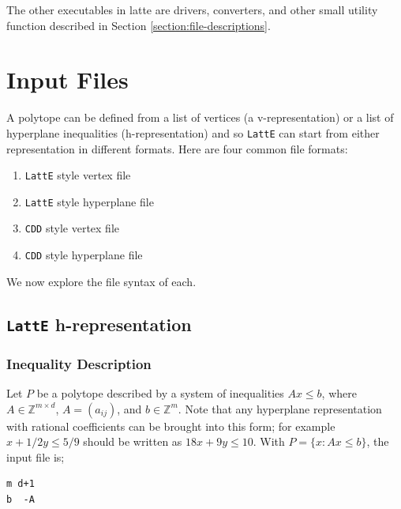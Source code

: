 \documentclass{article}
\newcommand{\Z}{{\mathbb Z}}
\newcommand{\latte}{{\tt LattE}\xspace}
\newcommand{\cdd}{{\tt CDD}\xspace}
\begin{document}
The other executables in latte are drivers, converters, and other small utility function described in Section \ref{section:file-descriptions}.


\section{Input Files}\label{Input Files}

A polytope can be defined from a list of vertices (a v-representation) or a list of hyperplane inequalities (h-representation) and so \latte can start from either representation in different formats. Here are four common file formats:
\begin{enumerate}
	\item \latte style vertex file
	\item \latte style hyperplane file
	\item \cdd style vertex file
	\item \cdd style hyperplane file
\end{enumerate}

We now explore the file syntax of each.

\subsection{\latte h-representation}

\subsubsection{Inequality Description}
Let $P$ be a polytope described by a
system of inequalities $Ax\leq b$, where $A\in\Z^{m\times d}$, 
$A=(a_{ij})$, and $b\in\Z^m$. Note that any hyperplane representation with rational coefficients can be brought into this form; for example $x + 1/2y \leq 5/9$ should be written as $18x +9y \leq 10$. With $P=\{x : Ax \leq b\}$, the input file is;
\begin{verbatim}
m d+1
b  -A
\end{verbatim}
\end{document}
